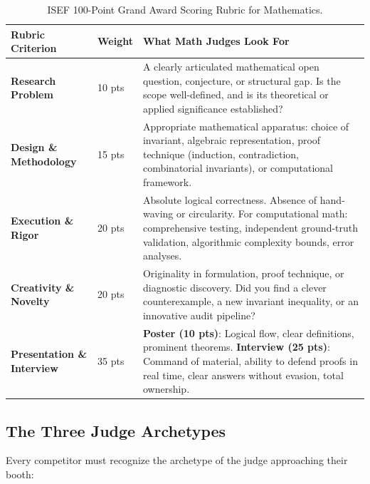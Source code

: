 \documentclass[11pt,letterpaper]{article}
\begin{document}
\begin{table}[h!]
\centering
\small
\begin{tabular}{p{3.2cm}p{1.8cm}p{10.2cm}}
\toprule
\textbf{Rubric Criterion} & \textbf{Weight} & \textbf{What Math Judges Look For} \\
\midrule
\textbf{Research Problem} & 10 pts & A clearly articulated mathematical open question, conjecture, or structural gap. Is the scope well-defined, and is its theoretical or applied significance established? \\
\addlinespace
\textbf{Design \& Methodology} & 15 pts & Appropriate mathematical apparatus: choice of invariant, algebraic representation, proof technique (induction, contradiction, combinatorial invariants), or computational framework. \\
\addlinespace
\textbf{Execution \& Rigor} & 20 pts & Absolute logical correctness. Absence of hand-waving or circularity. For computational math: comprehensive testing, independent ground-truth validation, algorithmic complexity bounds, error analyses. \\
\addlinespace
\textbf{Creativity \& Novelty} & 20 pts & Originality in formulation, proof technique, or diagnostic discovery. Did you find a clever counterexample, a new invariant inequality, or an innovative audit pipeline? \\
\addlinespace
\textbf{Presentation \& Interview} & 35 pts & \textbf{Poster (10 pts)}: Logical flow, clear definitions, prominent theorems. \textbf{Interview (25 pts)}: Command of material, ability to defend proofs in real time, clear answers without evasion, total ownership. \\
\bottomrule
\end{tabular}
\caption{ISEF 100-Point Grand Award Scoring Rubric for Mathematics.}
\end{table}

\subsection{The Three Judge Archetypes}

Every competitor must recognize the archetype of the judge approaching their booth:
\end{document}
